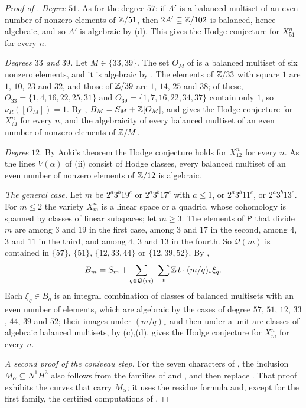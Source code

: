\begin{proof}[Proof of ]
\emph{Degree $51$.} As for the degree $57$: if $A'$ is a balanced multiset
of an even number of nonzero elements of $\mathbb{Z}/51$, then $2A'\subseteq
\mathbb{Z}/102$ is balanced, hence algebraic, and so $A'$ is algebraic by
(d). This gives the Hodge conjecture for $X^{n}_{51}$ for
every $n$.

\emph{Degrees $33$ and $39$.} Let $M\in\{33,39\}$. The set $O_{M}$ of
 is a balanced multiset of six nonzero elements, and it
is algebraic by . The elements of $\mathbb{Z}/33$ with square
$1$ are $1$, $10$, $23$ and $32$, and those of $\mathbb{Z}/39$ are $1$, $14$, $25$
and $38$; of these, $O_{33}=\{1,4,16,22,25,31\}$ and $O_{39}=\{1,7,16,22,
34,37\}$ contain only $1$, so $\nu_{R}([O_{M}])=1$. By ,
$B_{M}=S_{M}+\mathbb{Z}[O_{M}]$, and  gives the Hodge conjecture
for $X^{n}_{M}$ for every $n$, and the algebraicity of every balanced
multiset of an even number of nonzero elements of $\mathbb{Z}/M$.

\emph{Degree $12$.} By Aoki's theorem \cite[Theorem~0.1]{Aok00} the Hodge
conjecture holds for $X^{n}_{12}$ for every $n$. As the lines $V(\alpha)$ of
(ii) consist of Hodge classes, every balanced
multiset of an even number of nonzero elements of $\mathbb{Z}/12$ is algebraic.

\emph{The general case.} Let $m$ be $2^{a}3^{b}19^{c}$ or $2^{a}3^{b}17^{c}$
with $a\le1$, or $2^{a}3^{b}11^{c}$, or $2^{a}3^{b}13^{c}$. For $m\le2$ the
variety $X^{n}_{m}$ is a linear space or a quadric, whose cohomology is
spanned by classes of linear subspaces; let $m\ge3$. The elements of
$\mathsf P$ that divide $m$ are among $3$ and $19$ in the first case, among
$3$ and $17$ in the second, among $4$, $3$ and $11$ in the third, and among
$4$, $3$ and $13$ in the fourth. So $\mathcal Q(m)$ is contained in
$\{57\}$, $\{51\}$, $\{12,33,44\}$ or $\{12,39,52\}$. By ,
\[
  B_{m}=S_{m}+\sum_{q\in\mathcal Q(m)}\ \sum_{t}\ZZ\,t\cdot(m/q)_{*}\xi_{q}.
\]
Each $\xi_{q}\in B_{q}$ is an integral combination of classes of balanced
multisets with an even number of elements, which are algebraic by the cases
of degree $57$, $51$, $12$, $33$, $44$, $39$ and $52$; their images under
$(m/q)_{*}$ and then under a unit are classes of algebraic balanced
multisets, by (c),(d).  gives the
Hodge conjecture for $X^{n}_{m}$ for every $n$.

\emph{A second proof of the coniveau step.} For the seven characters of
, the inclusion $M_{\alpha}\subseteq N^{1}H^{3}$ also
follows from the families of
and , and  then replace
. That proof exhibits the curves that carry
$M_{\alpha}$; it uses the residue formula and, except for the first family,
the certified computations of .


\end{proof}
